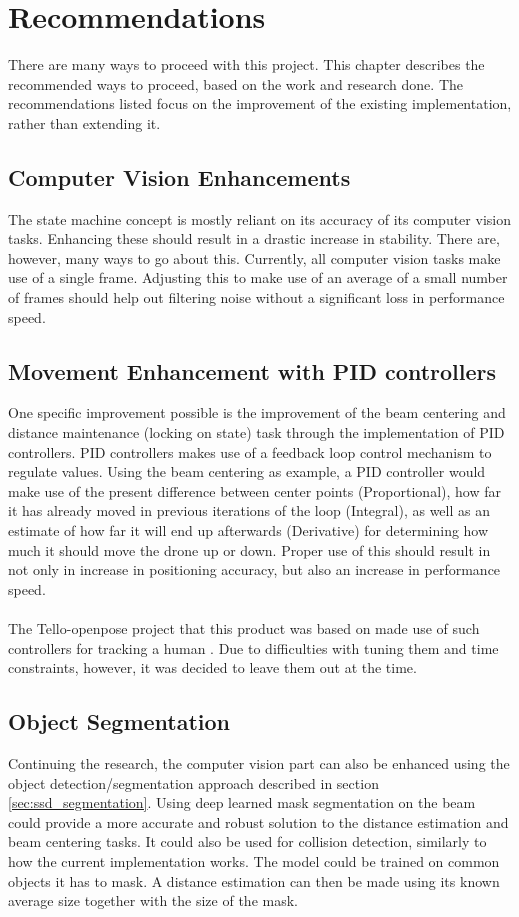 \chapter{Recommendations}
\label{ch:recommendations}
There are many ways to proceed with this project. This chapter describes the recommended ways to proceed, based on the work and research done. The recommendations listed focus on the improvement of the existing implementation, rather than extending it. 

\section{Computer Vision Enhancements}
The state machine concept is mostly reliant on its accuracy of its computer vision tasks. Enhancing these should result in a drastic increase in stability. There are, however, many ways to go about this. Currently, all computer vision tasks make use of a single frame. Adjusting this to make use of an average of a small number of frames should help out filtering noise without a significant loss in performance speed.

\section{Movement Enhancement with PID controllers}
One specific improvement possible is the improvement of the beam centering and distance maintenance (locking on state) task through the implementation of \gls{PID} controllers. \gls{PID} controllers makes use of a feedback loop control mechanism to regulate values. Using the beam centering as example, a \gls{PID} controller would make use of the present difference between center points (Proportional), how far it has already moved in previous iterations of the loop (Integral), as well as an estimate of how far it will end up afterwards (Derivative) for determining how much it should move the drone up or down. Proper use of this should result in not only in increase in positioning accuracy, but also an increase in performance speed.
\\\\
The Tello-openpose project that this product was based on made use of such controllers for tracking a human \citep{tello_openpose}. Due to difficulties with tuning them and time constraints, however, it was decided to leave them out at the time.

\section{Object Segmentation}
Continuing the research, the computer vision part can also be enhanced using the object detection/segmentation approach described in section \ref{sec:ssd_segmentation}. Using deep learned mask segmentation on the beam could provide a more accurate and robust solution to the distance estimation and beam centering tasks. It could also be used for collision detection, similarly to how the current implementation works. The model could be trained on common objects it has to mask. A distance estimation can then be made using its known average size together with the size of the mask. 